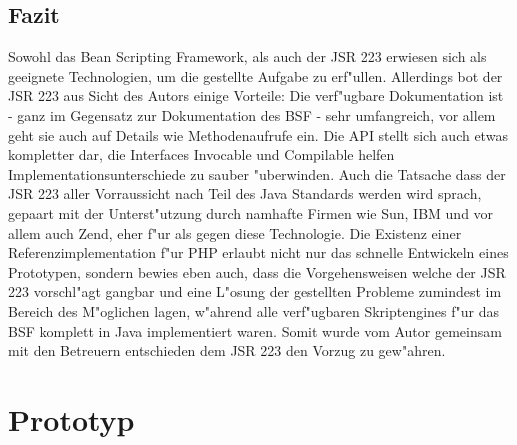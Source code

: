 \subsection{Fazit}
\label{sec:chap1:ana:fazit}

Sowohl das Bean Scripting Framework, als auch der JSR 223 erwiesen sich als geeignete Technologien, um die gestellte Aufgabe zu 
erf"ullen. Allerdings bot der JSR 223 aus Sicht des Autors einige Vorteile: 
Die verf"ugbare Dokumentation ist - ganz im Gegensatz zur Dokumentation des BSF - sehr umfangreich, vor allem geht sie auch
auf Details wie Methodenaufrufe ein. Die API stellt sich auch etwas kompletter dar, die Interfaces Invocable und Compilable 
helfen Implementationsunterschiede zu sauber "uberwinden. Auch die Tatsache dass der JSR 223 aller Vorraussicht nach Teil
des Java Standards werden wird sprach, gepaart mit der Unterst"utzung durch namhafte Firmen wie Sun, IBM und vor allem auch 
Zend, eher f"ur als gegen diese Technologie. Die Existenz einer Referenzimplementation f"ur PHP erlaubt nicht nur das
schnelle Entwickeln eines Prototypen, sondern bewies eben auch, dass die Vorgehensweisen welche der JSR 223 vorschl"agt 
gangbar und eine L"osung der gestellten Probleme zumindest im Bereich des M"oglichen lagen, w"ahrend alle verf"ugbaren
Skriptengines f"ur das BSF komplett in Java implementiert waren.
Somit wurde vom Autor gemeinsam mit den Betreuern entschieden dem JSR 223 den Vorzug zu gew"ahren.

\section{Prototyp}
\label{sec:chap1:prototype}

